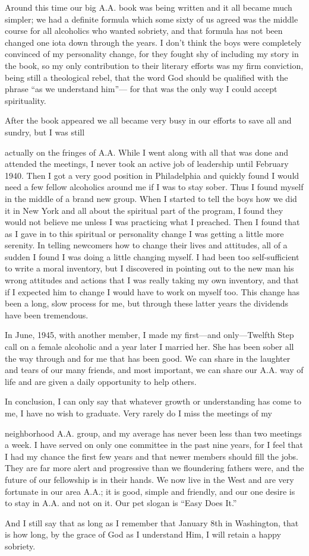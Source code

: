 Around this time our big A.A. book was being written and it all became much simpler; we had a definite formula which some sixty of us agreed was the middle course for all alcoholics who wanted sobriety, and that formula has not been changed one iota down through the years. I don’t think the boys were completely convinced of my personality change, for they fought shy of including my story in the book, so my only contribution to their literary efforts was my firm conviction, being still a theological rebel, that the word God should be qualified with the phrase “as we understand him”— for that was the only way I could accept spirituality.

After the book appeared we all became very busy in our efforts to save all and sundry, but I was still

actually on the fringes of A.A. While I went along with all that was done and attended the meetings, I never took an active job of leadership until February 1940. Then I got a very good position in Philadelphia and quickly found I would need a few fellow alcoholics around me if I was to stay sober. Thus I found myself in the middle of a brand new group. When I started to tell the boys how we did it in New York and all about the spiritual part of the program, I found they would not believe me unless I was practicing what I preached. Then I found that as I gave in to this spiritual or personality change I was getting a little more serenity. In telling newcomers how to change their lives and attitudes, all of a sudden I found I was doing a little changing myself. I had been too self-sufficient to write a moral inventory, but I discovered in pointing out to the new man his wrong attitudes and actions that I was really taking my own inventory, and that if I expected him to change I would have to work on myself too. This change has been a long, slow process for me, but through these latter years the dividends have been tremendous.

In June, 1945, with another member, I made my first—and only—Twelfth Step call on a female alcoholic and a year later I married her. She has been sober all the way through and for me that has been good. We can share in the laughter and tears of our many friends, and most important, we can share our A.A. way of life and are given a daily opportunity to help others.

In conclusion, I can only say that whatever growth or understanding has come to me, I have no wish to graduate. Very rarely do I miss the meetings of my

neighborhood A.A. group, and my average has never been less than two meetings a week. I have served on only one committee in the past nine years, for I feel that I had my chance the first few years and that newer members should fill the jobs. They are far more alert and progressive than we floundering fathers were, and the future of our fellowship is in their hands. We now live in the West and are very fortunate in our area A.A.; it is good, simple and friendly, and our one desire is to stay in A.A. and not on it. Our pet slogan is “Easy Does It.”

And I still say that as long as I remember that January 8th in Washington, that is how long, by the grace of God as I understand Him, I will retain a happy sobriety.
